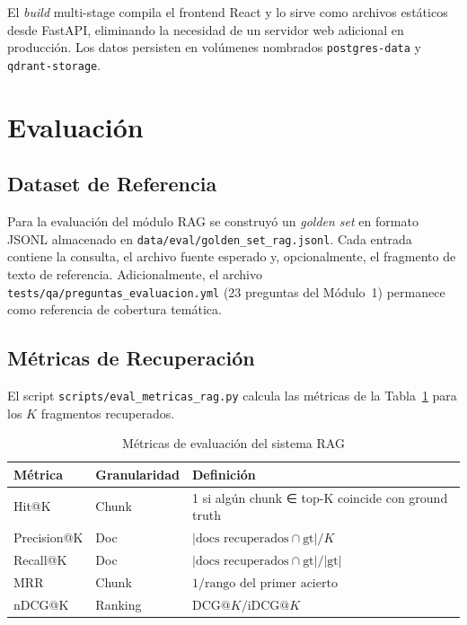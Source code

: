 \documentclass[conference]{IEEEtran}
\newcommand{\code}[1]{\texttt{\small #1}}
\begin{document}
El \textit{build} multi-stage compila el frontend React y lo sirve como
archivos estáticos desde FastAPI, eliminando la necesidad de un servidor web
adicional en producción. Los datos persisten en volúmenes nombrados
\code{postgres-data} y \code{qdrant-storage}.

\section{Evaluación}
\label{sec:eval}

\subsection{Dataset de Referencia}

Para la evaluación del módulo RAG se construyó un \textit{golden set} en
formato JSONL almacenado en \code{data/eval/golden\_set\_rag.jsonl}. Cada
entrada contiene la consulta, el archivo fuente esperado y, opcionalmente,
el fragmento de texto de referencia. Adicionalmente, el archivo
\code{tests/qa/preguntas\_evaluacion.yml} (23 preguntas del Módulo~1) permanece
como referencia de cobertura temática.

\subsection{Métricas de Recuperación}

El script \code{scripts/eval\_metricas\_rag.py} calcula las métricas de la
Tabla~\ref{tab:metricas} para los $K$ fragmentos recuperados.

\begin{table}[ht]
\centering
\caption{Métricas de evaluación del sistema RAG}
\label{tab:metricas}
\setlength{\tabcolsep}{3pt}
\begin{tabular}{@{}lll@{}}
\toprule
\textbf{Métrica} & \textbf{Granularidad} & \textbf{Definición} \\
\midrule
Hit@K      & Chunk    & 1 si algún chunk ∈ top-K coincide con ground truth \\
Precision@K & Doc     & $|\text{docs recuperados} \cap \text{gt}| / K$ \\
Recall@K    & Doc     & $|\text{docs recuperados} \cap \text{gt}| / |\text{gt}|$ \\
MRR         & Chunk   & $1 / \text{rango del primer acierto}$ \\
nDCG@K      & Ranking & $\mathrm{DCG}@K / \mathrm{iDCG}@K$ \\
\bottomrule
\end{tabular}
\end{table}
\end{document}
